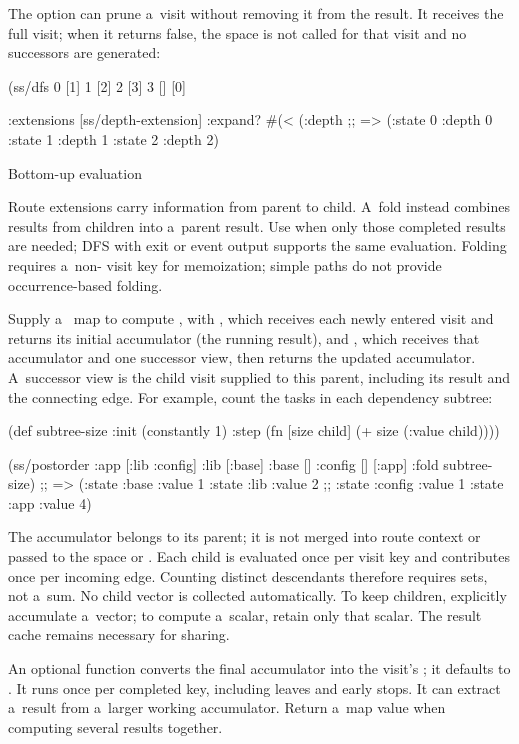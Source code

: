 The  option can prune a~visit without removing it from the
result. It receives the full visit; when it returns false, the space is not
called for that visit and no successors are generated:

\begtt {}
(ss/dfs {0 [1] 1 [2] 2 [3] 3 []}
        [0]
        {:extensions [ss/depth-extension]
         :expand? #(< (:depth %
;; => ({:state 0 :depth 0} {:state 1 :depth 1} {:state 2 :depth 2})
\endtt

\secc[folds] Bottom-up evaluation

Route extensions carry information from parent to child. A~fold instead
combines results from children into a~parent result. Use 
when only those completed results are needed; DFS with exit or event output
supports the same evaluation.
Folding requires a~non- visit key for memoization; simple paths
do not provide occurrence-based folding.

Supply a~ map to compute , with , which receives
each newly entered visit and returns its initial accumulator (the running
result), and , which receives that accumulator and one successor
view, then returns the updated accumulator. A~successor view is the child
visit supplied to this parent, including its result and the connecting edge.
For example, count the tasks in each dependency
subtree:

\begtt {}
(def subtree-size
  {:init (constantly 1)
   :step (fn [size child] (+ size (:value child)))})

(ss/postorder {:app [:lib :config]
               :lib [:base]
               :base []
               :config []}
              [:app]
              {:fold subtree-size})
;; => ({:state :base :value 1} {:state :lib :value 2}
;;     {:state :config :value 1} {:state :app :value 4})
\endtt

The accumulator belongs to its parent; it is not merged into route context
or passed to the space or . Each child is evaluated once per
visit key and contributes once per incoming edge. Counting distinct
descendants therefore requires sets, not a~sum.
No child vector is collected automatically. To keep children, explicitly
accumulate a~vector; to compute a~scalar, retain only that scalar.
The result cache remains necessary for sharing.

An optional  function converts the final accumulator into
the visit's ; it defaults to . It runs once per
completed key, including leaves and early stops. It can extract a~result
from a~larger working accumulator. Return a~map value when computing
several results together.

}

